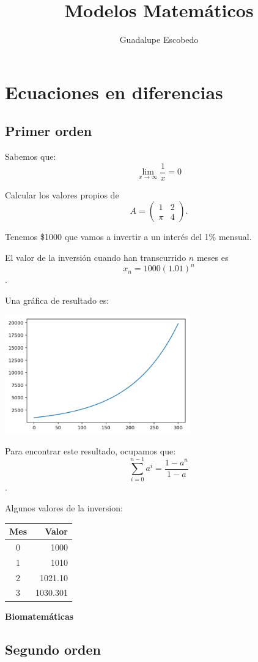 \documentclass{article}
\title{Modelos Matemáticos}
\author{Guadalupe Escobedo}
\begin{document}
\maketitle
\section{Ecuaciones en diferencias}
\subsection{Primer orden}
Sabemos que: $$\lim_{x\to\infty}\frac{1}{x}=0$$

Calcular los valores propios de $$A=
\begin{pmatrix}
1 & 2\\
\pi & 4

\end{pmatrix}.
$$

Tenemos \$1000 que vamos a invertir a un interés del 1\% mensual.

El valor de la inversión cuando han transcurrido $n$ meses es $$x_n=1000(1.01)^n$$.

Una gráfica de resultado es:

\begin{center}
\includegraphics[width=8cm]{grafica}
\end{center}

Para encontrar este resultado, ocupamos que:
$$\sum_{i=0}^{n-1}a^i=\frac{1-a^{n}}{1-a}$$.

Algunos valores de la inversion:
\begin{center}
\begin{tabular}{|c|r|}

\hline
Mes & Valor\\ 
\hline
0 & 1000 \\
1 & 1010 \\
2 & 1021.10 \\
3 & 1030.301 \\
\hline
\end{tabular}
\end{center}


\begin{center}
\huge
\textbf{Biomatemáticas}
\end{center}

\subsection{Segundo orden}
\end{document}
